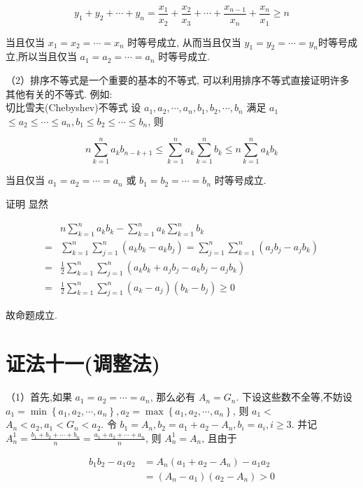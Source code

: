 $$
y_{1}+y_{2}+\cdots+y_{n}=\frac{x_{1}}{x_{2}}+\frac{x_{2}}{x_{3}}+\cdots+\frac{x_{n-1}}{x_{n}}+\frac{x_{n}}{x_{1}} \geqslant n
$$

当且仅当 $x_{1}=x_{2}=\cdots=x_{n}$ 时等号成立, 从而当且仅当 $y_{1}=y_{2}=\cdots=y_{n}$时等号成立,所以当且仅当 $a_{1}=a_{2}=\cdots=a_{n}$ 时等号成立.

（2）排序不等式是一个重要的基本的不等式, 可以利用排序不等式直接证明许多其他有关的不等式. 例如:\\
切比雪夫(Chebyshev)不等式 设 $a_{1}, a_{2}, \cdots, a_{n}, b_{1}, b_{2}, \cdots, b_{n}$ 满足 $a_{1}$ $\leqslant a_{2} \leqslant \cdots \leqslant a_{n}, b_{1} \leqslant b_{2} \leqslant \cdots \leqslant b_{n}$, 则

$$
n \sum_{k=1}^{n} a_{k} b_{n-k+1} \leqslant \sum_{k=1}^{n} a_{k} \sum_{k=1}^{n} b_{k} \leqslant n \sum_{k=1}^{n} a_{k} b_{k}
$$

当且仅当 $a_{1}=a_{2}=\cdots=a_{n}$ 或 $b_{1}=b_{2}=\cdots=b_{n}$ 时等号成立.

证明 显然

$$
\begin{aligned}
& n \sum_{k=1}^{n} a_{k} b_{k}-\sum_{k=1}^{n} a_{k} \sum_{k=1}^{n} b_{k} \\
= & \sum_{k=1}^{n} \sum_{j=1}^{n}\left(a_{k} b_{k}-a_{k} b_{j}\right)=\sum_{j=1}^{n} \sum_{k=1}^{n}\left(a_{j} b_{j}-a_{j} b_{k}\right) \\
= & \frac{1}{2} \sum_{k=1}^{n} \sum_{j=1}^{n}\left(a_{k} b_{k}+a_{j} b_{j}-a_{k} b_{j}-a_{j} b_{k}\right) \\
= & \frac{1}{2} \sum_{k=1}^{n} \sum_{j=1}^{n}\left(a_{k}-a_{j}\right)\left(b_{k}-b_{j}\right) \geqslant 0
\end{aligned}
$$

故命题成立.

\section*{证法十一(调整法)}
（1）首先,如果 $a_{1}=a_{2}=\cdots=a_{n}$, 那么必有 $A_{n}=G_{n}$. 下设这些数不全等,不妨设 $a_{1}=\min \left\{a_{1}, a_{2}, \cdots, a_{n}\right\}, a_{2}=\max \left\{a_{1}, a_{2}, \cdots, a_{n}\right\}$, 则 $a_{1}<$ $A_{n}<a_{2}, a_{1}<G_{n}<a_{2}$. 令 $b_{1}=A_{n}, b_{2}=a_{1}+a_{2}-A_{n}, b_{i}=a_{i}, i \geqslant 3$. 并记 $A_{n}^{1}=\frac{b_{1}+b_{2}+\cdots+b_{n}}{n}=\frac{a_{1}+a_{2}+\cdots+a_{n}}{n}$, 则 $A_{n}^{1}=A_{n}$, 且由于

$$
\begin{aligned}
b_{1} b_{2}-a_{1} a_{2} & =A_{n}\left(a_{1}+a_{2}-A_{n}\right)-a_{1} a_{2} \\
& =\left(A_{n}-a_{1}\right)\left(a_{2}-A_{n}\right)>0
\end{aligned}
$$

